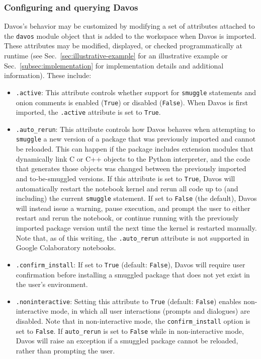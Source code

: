 \documentclass[preprint,12pt,a4paper]{elsarticle}
\begin{document}
\subsubsection{Configuring and querying Davos}\label{subsec:config}

Davos's behavior may be customized by modifying a set of attributes attached to
the \texttt{davos} module object that is added to the workspace when Davos is
imported. These attributes may be modified, displayed, or checked
programmatically at runtime (see Sec.~\ref{sec:illustrative-example} for an
illustrative example or Sec.~\ref{subsec:implementation} for implementation
details and additional information). These include:

\begin{itemize}
\item \texttt{.active}: This attribute controls whether support for \texttt{smuggle}
  statements and onion comments is enabled (\texttt{True}) or
  disabled (\texttt{False}).  When Davos is first imported,
  the \texttt{.active} attribute is set to \texttt{True}.

\item \texttt{.auto\_rerun}: This attribute controls how
  Davos behaves when attempting to \texttt{smuggle} a new
  version of a package that was previously imported and cannot be
  reloaded. This can happen if the package includes extension modules
  that dynamically link C or C++ objects to the Python interpreter,
  and the code that generates those objects was changed between the
  previously imported and to-be-smuggled versions.  If this attribute
  is set to \texttt{True}, Davos will automatically restart
  the notebook kernel and rerun all code up to (and including) the
  current \texttt{smuggle} statement. If set to \texttt{False} (the default),
  Davos will instead issue a warning, pause execution, and
  prompt the user to either restart and rerun the notebook, or
  continue running with the previously imported package version until
  the next time the kernel is restarted manually.  Note that, as of
  this writing, the \texttt{.auto\_rerun} attribute is not supported
  in Google Colaboratory notebooks.

\item \texttt{.confirm\_install}: If set to \texttt{True} (default:
  \texttt{False}), Davos will require user confirmation
  before installing a smuggled package that does not yet exist in the
  user's environment.

\item \texttt{.noninteractive}: Setting this attribute to
  \texttt{True} (default: \texttt{False}) enables non-in\-ter\-act\-ive
  mode, in which all user interactions (prompts and dialogues) are
  disabled. Note that in non-interactive mode, the
  \texttt{confirm\_install} option is set to \texttt{False}.  If
  \texttt{auto\_rerun} is set to \texttt{False} while in non-interactive
  mode, Davos will raise an exception if a smuggled package
  cannot be reloaded, rather than prompting the user.


\end{itemize}
\end{document}
